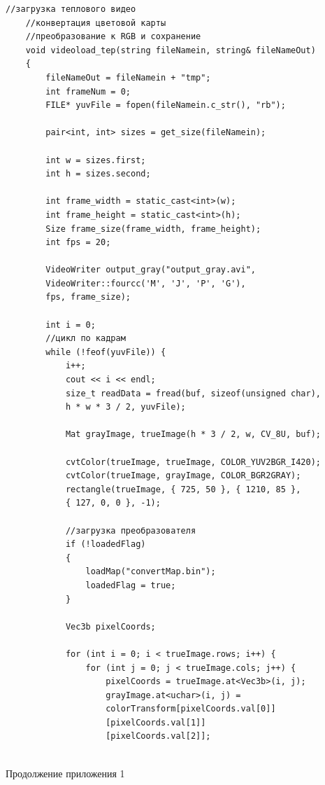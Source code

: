 \documentclass[14pt, a4paper]{extreport}
\begin{document}
\begin{Verbatim}[fontseries=c, fontsize=\fontsize{10pt}{12pt}\selectfont]
	//загрузка теплового видео
	//конвертация цветовой карты
	//преобразование к RGB и сохранение
	void videoload_tep(string fileNamein, string& fileNameOut)
	{
		fileNameOut = fileNamein + "tmp";
		int frameNum = 0;
		FILE* yuvFile = fopen(fileNamein.c_str(), "rb");
		
		pair<int, int> sizes = get_size(fileNamein);
		
		int w = sizes.first;
		int h = sizes.second;
		
		int frame_width = static_cast<int>(w);
		int frame_height = static_cast<int>(h);
		Size frame_size(frame_width, frame_height);
		int fps = 20;
		
		VideoWriter output_gray("output_gray.avi",
		VideoWriter::fourcc('M', 'J', 'P', 'G'),
		fps, frame_size);
		
		int i = 0;
		//цикл по кадрам
		while (!feof(yuvFile)) {
			i++;
			cout << i << endl;
			size_t readData = fread(buf, sizeof(unsigned char), 
			h * w * 3 / 2, yuvFile);
			
			Mat grayImage, trueImage(h * 3 / 2, w, CV_8U, buf);
			
			cvtColor(trueImage, trueImage, COLOR_YUV2BGR_I420);
			cvtColor(trueImage, grayImage, COLOR_BGR2GRAY);
			rectangle(trueImage, { 725, 50 }, { 1210, 85 },
			{ 127, 0, 0 }, -1);
			
			//загрузка преобразователя
			if (!loadedFlag)
			{
				loadMap("convertMap.bin");
				loadedFlag = true;
			}
			
			Vec3b pixelCoords;
			
			for (int i = 0; i < trueImage.rows; i++) {
				for (int j = 0; j < trueImage.cols; j++) {
					pixelCoords = trueImage.at<Vec3b>(i, j);
					grayImage.at<uchar>(i, j) =
					colorTransform[pixelCoords.val[0]]
					[pixelCoords.val[1]]
					[pixelCoords.val[2]];
					
\end{Verbatim}
\noindent Продолжение приложения 1
\end{document}
